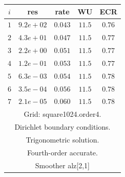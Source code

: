 \begin{table}[hbt]
\begin{center}
{%
\begin{tabular}{|c|c|c|c|c|} \hline 
 $i$   & res      & rate    &  WU    & ECR  \\   \hline 
 $ 1$  & $ 9.2e+02$ & $0.043$ & $11.5$ & $0.76$ \\ 
 $ 2$  & $ 4.3e+01$ & $0.047$ & $11.5$ & $0.77$ \\ 
 $ 3$  & $ 2.2e+00$ & $0.051$ & $11.5$ & $0.77$ \\ 
 $ 4$  & $ 1.2e-01$ & $0.053$ & $11.5$ & $0.77$ \\ 
 $ 5$  & $ 6.3e-03$ & $0.054$ & $11.5$ & $0.78$ \\ 
 $ 6$  & $ 3.5e-04$ & $0.056$ & $11.5$ & $0.78$ \\ 
 $ 7$  & $ 2.1e-05$ & $0.060$ & $11.5$ & $0.78$ \\ 
\hline 
\multicolumn{5}{|c|}{Grid: square1024.order4.}  \\
\multicolumn{5}{|c|}{Dirichlet boundary conditions.}  \\
\multicolumn{5}{|c|}{Trigonometric solution.}  \\
\multicolumn{5}{|c|}{Fourth-order accurate.}  \\
\multicolumn{5}{|c|}{Smoother alz[2,1]}  \\

\end{tabular}}
\end{center}
\end{table}
